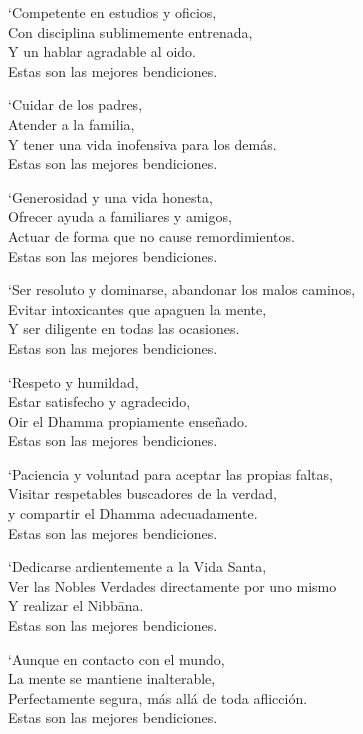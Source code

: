 \clearpage

`Competente en estudios y oficios,\\
Con disciplina sublimemente entrenada,\\
Y un hablar agradable al oido.\\
Estas son las mejores bendiciones.

`Cuidar de los padres,\\
Atender a la familia,\\
Y tener una vida inofensiva para los demás.\\
Estas son las mejores bendiciones.

`Generosidad y una vida honesta,\\
Ofrecer ayuda a familiares y amigos,\\
Actuar de forma que no cause remordimientos.\\
Estas son las mejores bendiciones.

`Ser resoluto y dominarse, abandonar los malos caminos,\\
Evitar intoxicantes que apaguen la mente,\\
Y ser diligente en todas las ocasiones.\\
Estas son las mejores bendiciones.

`Respeto y humildad,\\
Estar satisfecho y agradecido,\\
Oir el Dhamma propiamente enseñado.\\
Estas son las mejores bendiciones.

`Paciencia y voluntad para aceptar las propias faltas,\\
Visitar respetables buscadores de la verdad,\\
y compartir el Dhamma adecuadamente.\\
Estas son las mejores bendiciones.

\clearpage

`Dedicarse ardientemente a la Vida Santa,\\
Ver las Nobles Verdades directamente por uno mismo\\
Y realizar el Nibbāna.\\
Estas son las mejores bendiciones.

`Aunque en contacto con el mundo,\\
La mente se mantiene inalterable,\\
Perfectamente segura, más allá de toda aflicción.\\
Estas son las mejores bendiciones.

